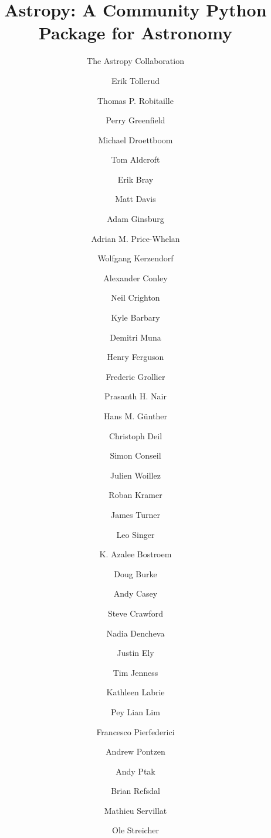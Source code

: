 \documentclass[traditabstract]{aa}
\begin{document}

\title{Astropy: A Community Python Package for Astronomy}




\author{
The Astropy Collaboration
  \and
Erik Tollerud\inst{\ref{inst:yale}}  %
  \and
Thomas P. Robitaille\inst{\ref{inst:mpia}}  %
  \and
Perry Greenfield\inst{\ref{inst:stsci}}  %
  \and
Michael Droettboom\inst{\ref{inst:stsci}}  %
  \and
Tom Aldcroft\inst{\ref{inst:cfa}}  %
  \and
Erik Bray\inst{\ref{inst:stsci}}
  \and
Matt Davis\inst{\ref{inst:stsci}}  %
  \and
Adam Ginsburg\inst{\ref{inst:colorado}}  %
  \and
Adrian M. Price-Whelan\inst{\ref{inst:columbia}}  %
  \and
Wolfgang Kerzendorf\inst{\ref{inst:toronto}}
  \and
Alexander Conley\inst{\ref{inst:colorado}}
  \and
Neil Crighton\inst{\ref{inst:mpia}}  %
  \and
Kyle Barbary\inst{\ref{inst:argonne}}  %
  \and
Demitri Muna\inst{\ref{inst:nyu}}  %
  \and
Henry Ferguson\inst{\ref{inst:stsci}}
  \and
Frederic Grollier
  \and
Prasanth H. Nair\inst{\ref{inst:freelance}}  %
  \and
Hans M. G\"unther\inst{\ref{inst:cfa}}  %
  \and
Christoph Deil\inst{\ref{inst:mpik}}  %
  \and
Simon Conseil\inst{\ref{inst:oamp}}
  \and
Julien Woillez
  \and
Roban Kramer  %
  \and
James Turner\inst{\ref{inst:gemini_s}}  %
  \and
Leo Singer\inst{\ref{inst:ligo}}  %
  \and
K. Azalee Bostroem\inst{\ref{inst:stsci}}  %
  \and
Doug Burke\inst{\ref{inst:cfa}}  %
  \and
Andy Casey\inst{\ref{inst:stromlo}}  %
  \and
Steve Crawford\inst{\ref{inst:saao}}
  \and
Nadia Dencheva\inst{\ref{inst:stsci}}  %
  \and
Justin Ely\inst{\ref{inst:stsci}}  %
  \and
Tim Jenness\inst{\ref{inst:jac}}  %
  \and
Kathleen Labrie\inst{\ref{inst:gemini_n}}  %
  \and
Pey Lian Lim\inst{\ref{inst:stsci}}  %
  \and
Francesco Pierfederici\inst{\ref{inst:stsci}}  %
  \and
Andrew Pontzen\inst{\ref{inst:oxford}}  %
  \and
Andy Ptak\inst{\ref{inst:gsfc}}  %
  \and
Brian Refsdal  %
  \and
Mathieu Servillat\inst{\ref{inst:saclay}}  %
  \and
Ole Streicher\inst{\ref{inst:leibniz}}  %
}
\end{document}
